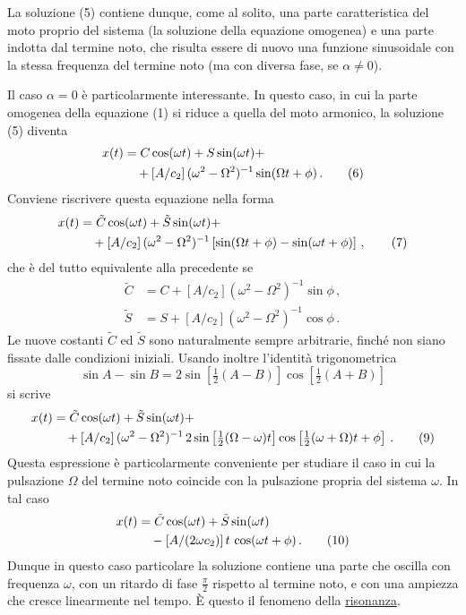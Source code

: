 \documentclass[11pt, a4paper]{book}
\numberwithin{equation}{section}
\begin{document}
La soluzione (5) contiene dunque, come al solito, una parte caratteristica del
moto proprio del sistema (la soluzione della equazione omogenea) e una parte
indotta dal termine noto, che risulta essere di nuovo una funzione sinusoidale
con la stessa frequenza del termine noto (ma con diversa fase, se $\alpha \neq 0$).

Il caso $\alpha = 0$ è particolarmente interessante. In questo caso, in cui la
parte omogenea della equazione (1) si riduce a quella del moto armonico, la
soluzione (5) diventa
\begin{align}
    x(t) &= C \cos(\omega t) + S \sin(\omega t) + \notag \\
    &\quad + \left[ A / c_2 \right] (\omega^2 - \Omega^2)^{-1} \sin(\Omega t + \phi) \,. \tag{6}
\end{align}
Conviene riscrivere questa equazione nella forma
\begin{align}
    x(t) &= \tilde{C} \cos(\omega t) + \tilde{S} \sin(\omega t) + \notag \\
    &\quad + \left[ A / c_2 \right] (\omega^2 - \Omega^2)^{-1} \left[ \sin(\Omega t+\phi) - \sin(\omega t+\phi) \right] \,, \tag{7}
\end{align}
che è del tutto equivalente alla precedente se
\begin{align}
    \tilde{C} &= C + \left[ A / c_2 \right] (\omega^2-\Omega^2)^{-1} \sin\phi \,, \tag{8a} \\
    \tilde{S} &= S + \left[ A / c_2 \right] (\omega^2-\Omega^2)^{-1} \cos\phi \,. \tag{8b}
\end{align}
Le nuove costanti $\tilde{C}$ ed $\tilde{S}$ sono naturalmente sempre arbitrarie, finché
non siano fissate dalle condizioni iniziali. Usando inoltre l'identità
trigonometrica
\[
    \sin A - \sin B = 2 \sin\left[\tfrac{1}{2}(A-B)\right] \cos\left[\tfrac{1}{2}(A+B)\right]
\]
si scrive
\begin{align}
    x(t) &= \tilde{C} \cos(\omega t) + \tilde{S} \sin(\omega t) + \notag \\
    &\quad + \left[ A / c_2 \right] (\omega^2-\Omega^2)^{-1} \, 2 \sin\left[\tfrac{1}{2}(\Omega-\omega)t\right] \cos\left[\tfrac{1}{2}(\omega+\Omega)t+\phi\right] \,. \tag{9}
\end{align}
Questa espressione è particolarmente conveniente per studiare il caso in cui la
pulsazione $\Omega$ del termine noto coincide con la pulsazione propria del sistema
$\omega$. In tal caso
\begin{align}
    x(t) &= \tilde{C} \cos(\omega t) + \tilde{S} \sin(\omega t) \notag \\
    &\quad - \left[ A/(2\omega c_2) \right] t \, \cos(\omega t + \phi) \,. \tag{10}
\end{align}
Dunque in questo caso particolare la soluzione contiene una parte che oscilla
con frequenza $\omega$, con un ritardo di fase $\frac{\pi}{2}$ rispetto al termine noto, e
con una ampiezza che cresce linearmente nel tempo. È questo il fenomeno della
\uline{risonanza}.
\end{document}
